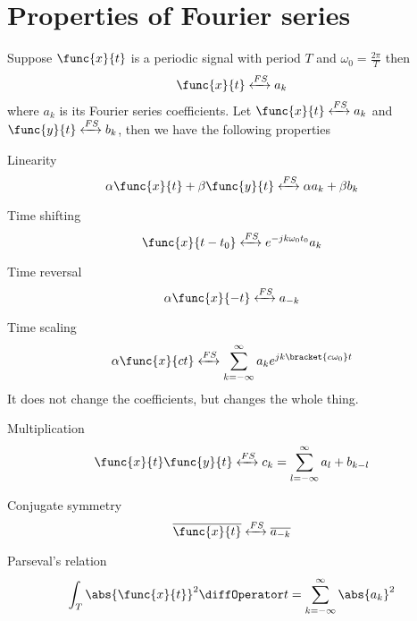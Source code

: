 \section{Properties of Fourier series}
Suppose \(\func{x}{t}\) is a periodic signal with period \(T\) and \(\omega_0 = \frac{2 \pi}{T}\) then 
\begin{equation*}
    \func{x}{t} \xleftrightarrow{FS} a_k
\end{equation*}
where \(a_k\) is its Fourier series coefficients. Let \(\func{x}{t} \xleftrightarrow{FS} a_k\) and  \(\func{y}{t} \xleftrightarrow{FS} b_k\), then we have the following properties 
\begin{definition}
    \item[Linearity]
    \begin{equation*}
        \alpha \func{x}{t} + \beta \func{y}{t} \xleftrightarrow{FS} \alpha a_k + \beta b_k
    \end{equation*}
    \item[Time shifting]
    \begin{equation*}
        \func{x}{t - t_0}  \xleftrightarrow{FS} e^{-jk\omega_0 t_0} a_k
    \end{equation*}
    \item[Time reversal]
    \begin{equation*}
        \alpha \func{x}{-t} \xleftrightarrow{FS}  a_{-k}
    \end{equation*}
    \item[Time scaling]
    \begin{equation*}
        \alpha \func{x}{ct} \xleftrightarrow{FS} \sum_{k = -\infty}^{\infty} a_k e^{jk \bracket{c\omega_0} t}
    \end{equation*}
    It does not change the coefficients, but changes the whole thing.
    \item[Multiplication]
    \begin{equation*}
        \func{x}{t}\func{y}{t} \xleftrightarrow{FS} c_k = \sum_{l = -\infty}^{\infty}  a_{l} +  b_{k-l}
    \end{equation*} 
    \item[Conjugate symmetry]
    \begin{equation*}
        \overline{ \func{x}{t}} \xleftrightarrow{FS}  \overline{a_{-k}}
    \end{equation*}
    \item[Parseval's relation]
    \begin{equation*}
        \int_T \abs{\func{x}{t}}^2 \diffOperator t = \sum_{k = -\infty}^{\infty} \abs{a_k}^2

\end{equation*}
\end{definition}
